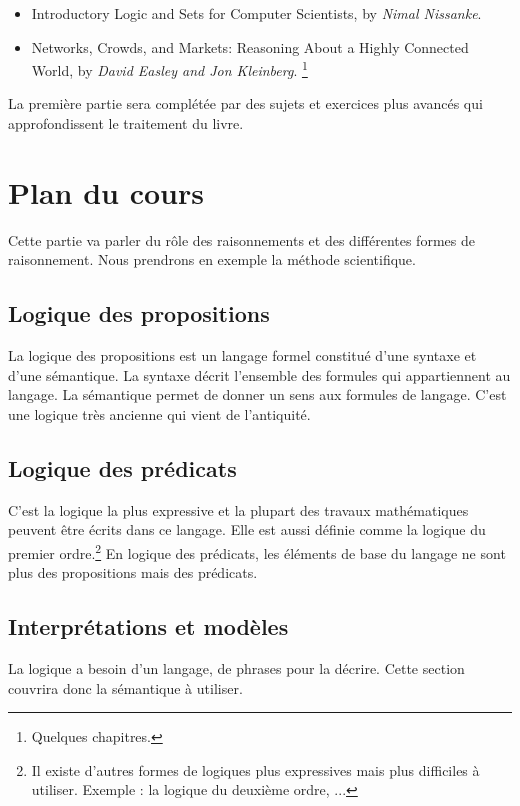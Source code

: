 \begin{itemize}
\item Introductory Logic and Sets for Computer Scientists, by \textit{Nimal Nissanke}.
\item Networks, Crowds, and Markets: Reasoning About a Highly Connected World, by \textit{David Easley and Jon Kleinberg}. \footnote{Quelques chapitres.}
\end{itemize}

La première partie sera complétée par des sujets et exercices plus avancés qui approfondissent le traitement du livre.

\section*{Plan du cours}

Cette partie va parler du rôle des raisonnements et des différentes formes de raisonnement. Nous prendrons en exemple la méthode scientifique.

\subsection*{Logique des propositions}

La logique des propositions est un langage formel constitué d'une syntaxe et d'une sémantique. La syntaxe décrit l'ensemble des formules qui appartiennent au langage. La sémantique permet de donner un sens aux formules de langage. C'est une logique très ancienne qui vient de l'antiquité. 

\subsection*{Logique des prédicats}

C'est la logique la plus expressive et la plupart des travaux mathématiques peuvent être écrits dans ce langage. Elle est aussi définie comme la logique du premier ordre.\footnote{Il existe d'autres formes de logiques plus expressives mais plus difficiles à utiliser. Exemple : la logique du deuxième ordre, ...} En logique des prédicats, les éléments de base du langage ne sont plus des propositions mais des prédicats. 

\subsection*{Interprétations et modèles}

La logique a besoin d'un langage, de phrases pour la décrire. Cette section couvrira donc la sémantique à utiliser.

